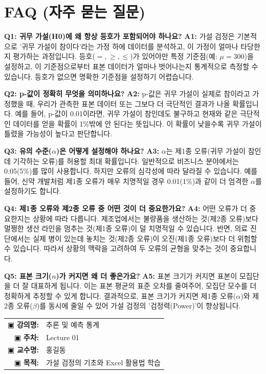 \documentclass[11pt,a4paper]{article}
\makeatletter
\theoremstyle{definition}
\newcommand{\metainfo}[4]{
\begin{tcolorbox}[
    colback=lightpurple,
    colframe=darkpurple,
    boxrule=1pt,
    arc=2mm,
    left=10pt,
    right=10pt,
    top=8pt,
    bottom=8pt
]
\begin{tabular}{@{}rl@{}}
▣ \textbf{강의명:} & #1 \\[0.3em]
▣ \textbf{주차:} & #2 \\[0.3em]
▣ \textbf{교수명:} & #3 \\[0.3em]
▣ \textbf{목적:} & \begin{minipage}[t]{0.75\textwidth}#4\end{minipage}
\end{tabular}
\end{tcolorbox}
}
\makeatother
\begin{document}
\newpage
\section*{FAQ (자주 묻는 질문)}

\textbf{Q1: 귀무 가설(H0)에 왜 항상 등호가 포함되어야 하나요?}
\textbf{A1:} 가설 검정은 기본적으로 '귀무 가설이 참이다'라는 가정 하에 데이터를 분석하고, 이 가정이 얼마나 타당한지 평가하는 과정입니다. 등호($=, \ge, \le$)가 있어야만 특정 기준점(예: $\mu=300$)을 설정하고, 이 기준점으로부터 표본 데이터가 얼마나 벗어나는지 통계적으로 측정할 수 있습니다. 등호가 없으면 명확한 기준점을 설정하기 어렵습니다.

\textbf{Q2: p-값이 정확히 무엇을 의미하나요?}
\textbf{A2:} p-값은 귀무 가설이 실제로 참이라고 가정했을 때, 우리가 관측한 표본 데이터 또는 그보다 더 극단적인 결과가 나올 확률입니다. 예를 들어, p-값이 0.01이라면, 귀무 가설이 참인데도 불구하고 현재와 같은 극단적인 데이터를 얻을 확률이 1\%밖에 안 된다는 뜻입니다. 이 확률이 낮을수록 귀무 가설이 틀렸을 가능성이 높다고 판단합니다.

\textbf{Q3: 유의 수준($\alpha$)은 어떻게 설정해야 하나요?}
\textbf{A3:} $\alpha$는 제1종 오류(귀무 가설이 참인데 기각하는 오류)를 허용할 최대 확률입니다. 일반적으로 비즈니스 분야에서는 0.05(5\%)를 많이 사용합니다. 하지만 오류의 심각성에 따라 달라질 수 있습니다. 예를 들어, 신약 개발처럼 제1종 오류가 매우 치명적일 경우 0.01(1\%)과 같이 더 엄격한 $\alpha$를 설정하기도 합니다.

\textbf{Q4: 제1종 오류와 제2종 오류 중 어떤 것이 더 중요한가요?}
\textbf{A4:} 어떤 오류가 더 중요한지는 상황에 따라 다릅니다. 제조업에서는 불량품을 생산하는 것(제2종 오류)보다 멀쩡한 생산 라인을 멈추는 것(제1종 오류)이 덜 치명적일 수 있습니다. 반면, 의료 진단에서는 실제 병이 있는데 놓치는 것(제2종 오류)이 오진(제1종 오류)보다 더 위험할 수 있습니다. 따라서 상황의 맥락을 고려하여 두 오류의 균형을 맞추는 것이 중요합니다.

\textbf{Q5: 표본 크기($n$)가 커지면 왜 더 좋은가요?}
\textbf{A5:} 표본 크기가 커지면 표본이 모집단을 더 잘 대표하게 됩니다. 이는 표본 평균의 표준 오차를 줄여주어, 모집단 모수를 더 정확하게 추정할 수 있게 합니다. 결과적으로, 표본 크기가 커지면 제1종 오류($\alpha$)와 제2종 오류($\beta$)를 동시에 줄일 수 있어 가설 검정의 '검정력(Power)'이 향상됩니다.

\newpage

\thispagestyle{firstpage}

\metainfo{추론 및 예측 통계}{Lecture 01}{홍길동}{가설 검정의 기초와 Excel 활용법 학습}
\end{document}
